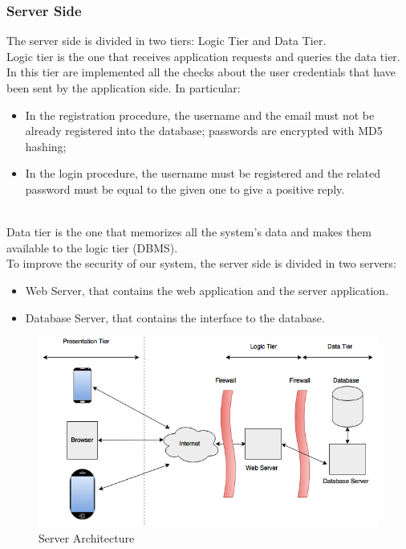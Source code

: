 	\subsubsection{Server Side}
	The server side is divided in two tiers: Logic Tier and Data Tier.
	\\
	Logic tier is the one that receives application requests and queries the data tier. In this tier are implemented all the checks about the user credentials that have been sent by the application side. In particular:
		\begin{itemize}
			\item In the registration procedure, the username and the email must not be already registered into the database; passwords are encrypted with MD5 hashing;
			\item In the login procedure, the username must be registered and the related password must be equal to the given one to give a positive reply.
		\end{itemize}
	~\\
	Data tier is the one that memorizes all the system's data and makes them available to the logic tier (DBMS).
	~\\
	To improve the security of our system, the server side is divided in two servers:
		\begin{itemize}
			\item Web Server, that contains the web application and the server application.
			\item Database Server, that contains the interface to the database.
		\end{itemize}

	\begin{figure}[H]
		\centering
		\includegraphics[width=\textwidth, scale=0.5]{IMG/ServerArchitecture.png}
		\caption{Server Architecture}\label{sec:FigureServerArchitecture}
	\end{figure}